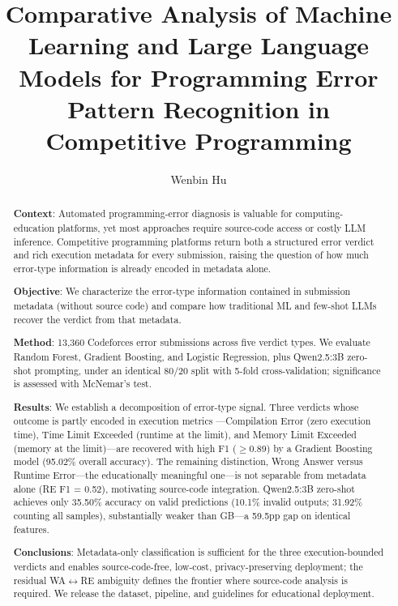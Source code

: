 \documentclass[acmsmall]{acmart}
\title{Comparative Analysis of Machine Learning and Large Language Models
       for Programming Error Pattern Recognition in Competitive Programming}
\author{Wenbin Hu}
\affiliation{
  \institution{School of Computer Science, Xijing University}
  \city{Xi'an}
  \country{China}
}
\begin{document}
\begin{abstract}
\noindent\textbf{Context}: Automated programming-error diagnosis is valuable for
computing-education platforms, yet most approaches require source-code access
or costly LLM inference. Competitive programming platforms return both a
structured error verdict and rich execution metadata for every submission,
raising the question of how much error-type information is already encoded in
metadata alone.

\noindent\textbf{Objective}: We characterize the error-type information contained
in submission metadata (without source code) and compare how traditional ML
and few-shot LLMs recover the verdict from that metadata.

\noindent\textbf{Method}: 13,360 Codeforces error submissions across five verdict
types. We evaluate Random Forest, Gradient Boosting, and Logistic Regression,
plus Qwen2.5:3B zero-shot prompting, under an identical 80/20 split with
5-fold cross-validation; significance is assessed with McNemar's test.

\noindent\textbf{Results}: We establish a decomposition of error-type
signal. Three verdicts whose outcome is partly encoded in execution metrics
---Compilation Error (zero execution time), Time Limit Exceeded (runtime at the
limit), and Memory Limit Exceeded (memory at the limit)---are recovered with
high F1 ($\ge$0.89) by a Gradient Boosting model (95.02\% overall accuracy).
The remaining distinction, Wrong Answer versus Runtime Error---the
educationally meaningful one---is not separable from metadata alone (RE F1 =
0.52), motivating source-code integration. Qwen2.5:3B zero-shot achieves only
35.50\% accuracy on valid predictions (10.1\% invalid outputs; 31.92\%
counting all samples), substantially weaker than GB---a 59.5pp gap on
identical features.

\noindent\textbf{Conclusions}: Metadata-only classification is sufficient for the
three execution-bounded verdicts and enables source-code-free, low-cost,
privacy-preserving deployment; the residual WA$\leftrightarrow$RE ambiguity
defines the frontier where source-code analysis is required. We release the
dataset, pipeline, and guidelines for educational deployment.

\end{abstract}

\maketitle
\end{document}
